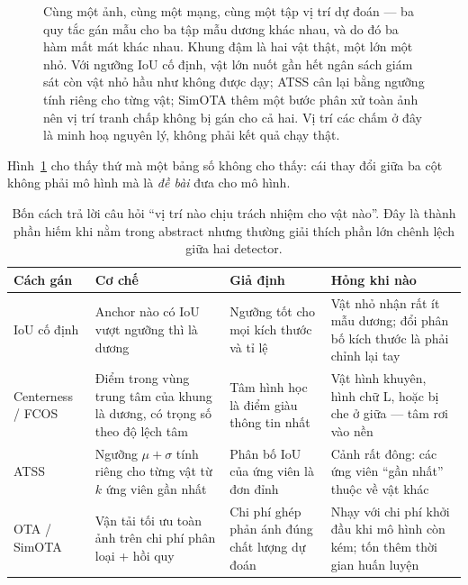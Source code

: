 \documentclass[../../../deep_learning.tex]{subfiles}
\begin{document}
\begin{figure}[H]
{}
\caption{Cùng một ảnh, cùng một mạng, cùng một tập vị trí dự đoán --- ba quy tắc gán mẫu cho ba tập mẫu dương khác nhau, và do đó ba hàm mất mát khác nhau. Khung đậm là hai vật thật, một lớn một nhỏ. Với ngưỡng IoU cố định, vật lớn nuốt gần hết ngân sách giám sát còn vật nhỏ hầu như không được dạy; ATSS cân lại bằng ngưỡng tính riêng cho từng vật; SimOTA thêm một bước phân xử toàn ảnh nên vị trí tranh chấp không bị gán cho cả hai. Vị trí các chấm ở đây là minh hoạ nguyên lý, không phải kết quả chạy thật.}
\label{fig:gan-mau-ba-cach}
\end{figure}

Hình~\ref{fig:gan-mau-ba-cach} cho thấy thứ mà một bảng số không cho thấy: cái thay đổi giữa ba cột không phải mô hình mà là \emph{đề bài} đưa cho mô hình.

\begin{table}[H]\centering\small
\caption{Bốn cách trả lời câu hỏi ``vị trí nào chịu trách nhiệm cho vật nào''. Đây là thành phần hiếm khi nằm trong abstract nhưng thường giải thích phần lớn chênh lệch giữa hai detector.}
\label{tab:label-assign}
\begin{tabularx}{\linewidth}{@{}L{2.05cm}YYL{4.0cm}@{}}
\toprule
\textbf{Cách gán} & \textbf{Cơ chế} & \textbf{Giả định} & \textbf{Hỏng khi nào}\\
\midrule
IoU cố định & Anchor nào có IoU vượt ngưỡng thì là dương & Ngưỡng tốt cho mọi kích thước và tỉ lệ & Vật nhỏ nhận rất ít mẫu dương; đổi phân bố kích thước là phải chỉnh lại tay\\
Centerness / FCOS & Điểm trong vùng trung tâm của khung là dương, có trọng số theo độ lệch tâm & Tâm hình học là điểm giàu thông tin nhất & Vật hình khuyên, hình chữ L, hoặc bị che ở giữa --- tâm rơi vào nền\\
ATSS & Ngưỡng \(\mu+\sigma\) tính riêng cho từng vật từ \(k\) ứng viên gần nhất & Phân bố IoU của ứng viên là đơn đỉnh & Cảnh rất đông: các ứng viên ``gần nhất'' thuộc về vật khác\\
OTA / SimOTA & Vận tải tối ưu toàn ảnh trên chi phí phân loại + hồi quy & Chi phí ghép phản ánh đúng chất lượng dự đoán & Nhạy với chi phí khởi đầu khi mô hình còn kém; tốn thêm thời gian huấn luyện\\
\bottomrule
\end{tabularx}
\end{table}
\end{document}
